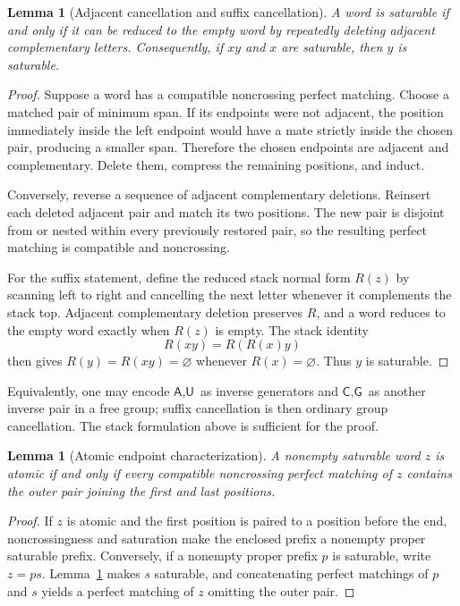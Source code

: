 \documentclass[11pt]{article}
\newtheorem{lemma}[theorem]{Lemma}
\newcommand{\A}{\textsf{A}}
\newcommand{\C}{\textsf{C}}
\newcommand{\G}{\textsf{G}}
\newcommand{\U}{\textsf{U}}
\begin{document}
\begin{lemma}[Adjacent cancellation and suffix cancellation]
\label{lem:suffix-cancel}
A word is saturable if and only if it can be reduced to the empty word by repeatedly deleting adjacent complementary letters.  Consequently, if $xy$ and $x$ are saturable, then $y$ is saturable.
\end{lemma}

\begin{proof}
Suppose a word has a compatible noncrossing perfect matching.  Choose a matched pair of minimum span.  If its endpoints were not adjacent, the position immediately inside the left endpoint would have a mate strictly inside the chosen pair, producing a smaller span.  Therefore the chosen endpoints are adjacent and complementary.  Delete them, compress the remaining positions, and induct.

Conversely, reverse a sequence of adjacent complementary deletions.  Reinsert each deleted adjacent pair and match its two positions.  The new pair is disjoint from or nested within every previously restored pair, so the resulting perfect matching is compatible and noncrossing.

For the suffix statement, define the reduced stack normal form $R(z)$ by scanning left to right and cancelling the next letter whenever it complements the stack top.  Adjacent complementary deletion preserves $R$, and a word reduces to the empty word exactly when $R(z)$ is empty.  The stack identity
\[
R(xy)=R(R(x)y)
\]
then gives $R(y)=R(xy)=\varnothing$ whenever $R(x)=\varnothing$.  Thus $y$ is saturable.
\end{proof}

Equivalently, one may encode $\A,\U$ as inverse generators and $\C,\G$ as another inverse pair in a free group; suffix cancellation is then ordinary group cancellation.  The stack formulation above is sufficient for the proof.

\begin{lemma}[Atomic endpoint characterization]
\label{lem:atomic-endpoint}
A nonempty saturable word $z$ is atomic if and only if every compatible noncrossing perfect matching of $z$ contains the outer pair joining the first and last positions.
\end{lemma}

\begin{proof}
If $z$ is atomic and the first position is paired to a position before the end, noncrossingness and saturation make the enclosed prefix a nonempty proper saturable prefix.  Conversely, if a nonempty proper prefix $p$ is saturable, write $z=ps$.  Lemma~\ref{lem:suffix-cancel} makes $s$ saturable, and concatenating perfect matchings of $p$ and $s$ yields a perfect matching of $z$ omitting the outer pair.
\end{proof}
\end{document}
